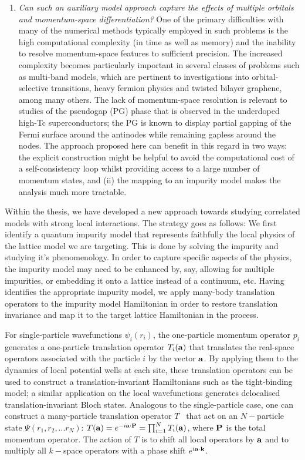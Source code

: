 \begin{enumerate}
	\item {\it Can such an auxiliary model approach capture the effects of multiple orbitals and momentum-space differentiation?} One of the primary difficulties with many of the numerical methods typically employed in such problems is the high computational complexity (in time as well as memory) and the inability to resolve momentum-space features to sufficient precision. The increased complexity becomes particularly important in several classes of problems such as multi-band models, which are pertinent to investigations into orbital-selective transitions, heavy fermion physics and twisted bilayer graphene, among many others. The lack of momentum-space resolution is relevant to studies of the pseudogap (PG) phase that is observed in the underdoped high-Tc superconductors; the PG is known to display partial gapping of the Fermi surface around the antinodes while remaining gapless around the nodes. The approach proposed here can benefit in this regard in two ways: the explicit construction might be helpful to avoid the computational cost of a self-consistency loop whilst providing access to a large number of momentum states, and (ii) the mapping to an impurity model makes the analysis much more tractable.
\end{enumerate}

Within the thesis, we have developed a new approach towards studying correlated models with strong local interactions. The strategy goes as follows: We first identify a quantum impurity model that represents faithfully the local physics of the lattice model we are targeting. This is done by solving the impurity and studying it's phenomenology. In order to capture specific aspects of the physics, the impurity model may need to be enhanced by, say, allowing for multiple impurities, or embedding it onto a lattice instead of a continuum, etc. Having identifies the appropriate impurity model, we apply many-body translation operators to the impurity model Hamiltonian in order to restore translation invariance and map it to the target lattice Hamiltonian in the process.

For single-particle wavefunctions \(\psi_i(r_i)\), the one-particle momentum operator \(p_i\) generates a one-particle translation operator \(T_i({\bf a})\) that translates the real-space operators associated with the particle \(i\) by the vector \({\bf a}\). By applying them to the dynamics of local potential wells at each site, these translation operators can be used to construct a translation-invariant Hamiltonians such as the tight-binding model; a similar application on the local wavefunctions generates delocalised translation-invariant Bloch states. Analogous to the single-particle case, one can construct a many-particle translation operator \(T\)~\cite{Calais_1995} that act on an \(N-\)particle state \(\Psi(r_1,r_2,...r_N)\): \(T({\bf a}) = e^{-i \bf a \cdot \bf P} = \prod_{i=1}^N T_i({\bf a})\), where \(\bf P\) is the total momentum operator. The action of \(T\) is to shift all local operators by \({\bf a}\) and to multiply all \(k-\)space operators with a phase shift \(e^{i {\bf a}\cdot{\bf k}}\).

